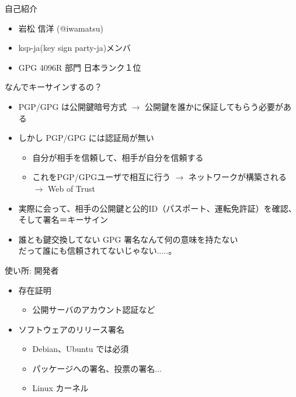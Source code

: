 \frame{\titlepage{}}

\begin{frame}{自己紹介}
\begin{itemize}[<+->]

\item 岩松 信洋 (@iwamatsu)
\item ksp-ja(key sign party-ja)メンバ
\item GPG 4096R 部門 日本ランク１位
\end{itemize}
\end{frame}

\begin{frame}
\begin{center}
\LARGE{なんでキーサインするの？}
\end{center}
\end{frame}

\begin{frame}
  \begin{itemize}[<+->]
    \item PGP/GPG は公開鍵暗号方式 $\rightarrow$ 公開鍵を誰かに保証してもらう必要がある
    \item しかし PGP/GPG には認証局が無い
    \begin{itemize}
      \item 自分が相手を信頼して、相手が自分を信頼する
      \item これをPGP/GPGユーザで相互に行う $\rightarrow$ ネットワークが構築される $\rightarrow$ Web of Trust
    \end{itemize}
    \item 実際に会って、相手の公開鍵と公的ID（パスポート、運転免許証）を確認、そして署名＝キーサイン
    \item 誰とも鍵交換してない GPG 署名なんて何の意味を持たない\\
          だって誰にも信頼されてないじゃない.....。
  \end{itemize}
\end{frame}

\begin{frame}{使い所: 開発者}
\begin{itemize}
  \item 存在証明
  \begin{itemize}
    \item 公開サーバのアカウント認証など
  \end{itemize}
  \item ソフトウェアのリリース署名
  \begin{itemize}
    \item Debian、Ubuntu では必須
    \item パッケージへの署名、投票の署名...
    \item Linux カーネル
\end{itemize}
\end{itemize}
\end{frame}

